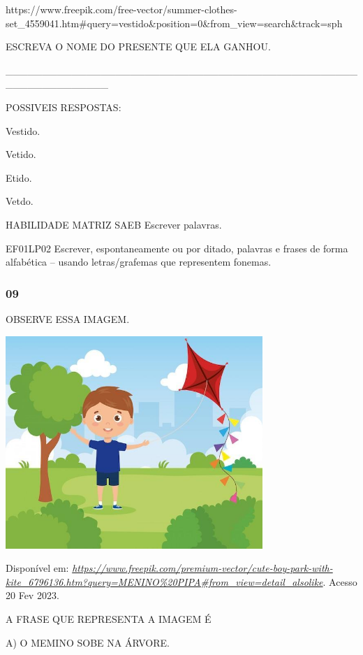 \begin{escola}
https://www.freepik.com/free-vector/summer-clothes-set\_4559041.htm\#query=vestido\&position=0\&from\_view=search\&track=sph

ESCREVA O NOME DO PRESENTE QUE ELA GANHOU.

\_\_\_\_\_\_\_\_\_\_\_\_\_\_\_\_\_\_\_\_\_\_\_\_\_\_\_\_\_\_\_\_\_\_\_\_\_\_\_\_\_\_\_\_\_\_\_\_\_\_\_\_\_\_\_\_\_\_\_\_\_\_

POSSIVEIS RESPOSTAS:

Vestido.

Vetido.

Etido.

Vetdo.

HABILIDADE MATRIZ SAEB Escrever palavras.

EF01LP02 Escrever, espontaneamente ou por ditado, palavras e frases de
forma alfabética -- usando letras/grafemas que representem fonemas.

\subsubsection{09 }\label{section-65}

OBSERVE ESSA IMAGEM.

\includegraphics[width=3.84043in,height=3.16853in]{media/image233.jpg}

Disponível em:
\href{https://www.freepik.com/premium-vector/cute-boy-park-with-kite_6796136.htm?query=MENINO\%20PIPA\#from_view=detail_alsolike}{\emph{https://www.freepik.com/premium-vector/cute-boy-park-with-kite\_6796136.htm?query=MENINO\%20PIPA\#from\_view=detail\_alsolike}}.
Acesso 20 Fev 2023.

A FRASE QUE REPRESENTA A IMAGEM É

A) O MEMINO SOBE NA ÁRVORE.


\end{escola}
